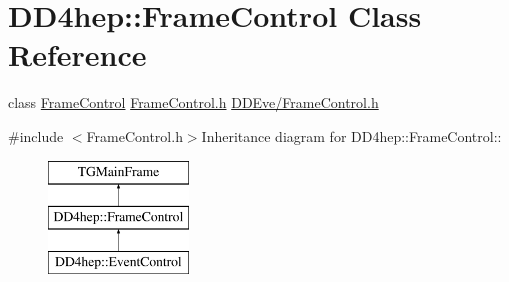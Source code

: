 \hypertarget{class_d_d4hep_1_1_frame_control}{
\section{DD4hep::FrameControl Class Reference}
\label{class_d_d4hep_1_1_frame_control}
}


class \hyperlink{class_d_d4hep_1_1_frame_control}{FrameControl} \hyperlink{_frame_control_8h}{FrameControl.h} \hyperlink{_frame_control_8h}{DDEve/FrameControl.h}  


{\ttfamily \#include $<$FrameControl.h$>$}Inheritance diagram for DD4hep::FrameControl::\begin{figure}[H]
\begin{center}
\leavevmode
\includegraphics[height=3cm]{class_d_d4hep_1_1_frame_control}
\end{center}
\end{figure}
